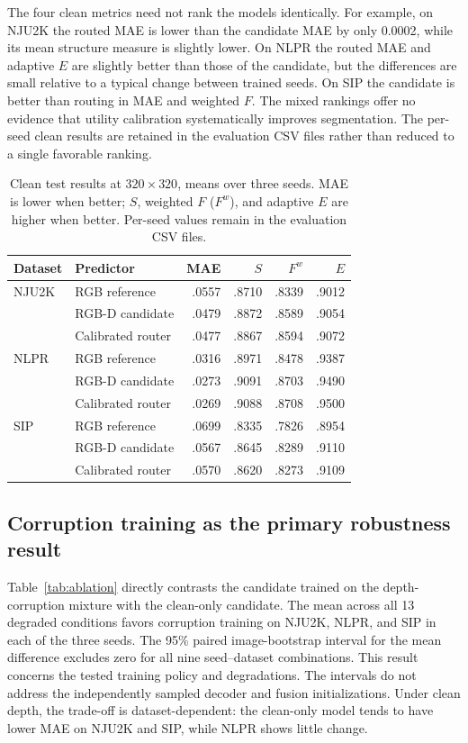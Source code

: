 \documentclass[11pt]{article}
\begin{document}
The four clean metrics need not rank the models identically. For example, on NJU2K the routed MAE is lower than the candidate MAE by only 0.0002, while its mean structure measure is slightly lower. On NLPR the routed MAE and adaptive $E$ are slightly better than those of the candidate, but the differences are small relative to a typical change between trained seeds. On SIP the candidate is better than routing in MAE and weighted $F$. The mixed rankings offer no evidence that utility calibration systematically improves segmentation. The per-seed clean results are retained in the evaluation CSV files rather than reduced to a single favorable ranking.

\begin{table}[t]\centering\small
\caption{Clean test results at $320\times320$, means over three seeds. MAE is lower when better; $S$, weighted $F$ ($F^w$), and adaptive $E$ are higher when better. Per-seed values remain in the evaluation CSV files.}
\label{tab:clean}
\begin{tabular}{llrrrr}\toprule Dataset & Predictor & MAE & $S$ & $F^w$ & $E$\\\midrule
NJU2K & RGB reference & .0557 & .8710 & .8339 & .9012\\
 & RGB-D candidate & .0479 & .8872 & .8589 & .9054\\
 & Calibrated router & .0477 & .8867 & .8594 & .9072\\\midrule
NLPR & RGB reference & .0316 & .8971 & .8478 & .9387\\
 & RGB-D candidate & .0273 & .9091 & .8703 & .9490\\
 & Calibrated router & .0269 & .9088 & .8708 & .9500\\\midrule
SIP & RGB reference & .0699 & .8335 & .7826 & .8954\\
 & RGB-D candidate & .0567 & .8645 & .8289 & .9110\\
 & Calibrated router & .0570 & .8620 & .8273 & .9109\\\bottomrule\end{tabular}
\end{table}

\subsection{Corruption training as the primary robustness result}
Table~\ref{tab:ablation} directly contrasts the candidate trained on the depth-corruption mixture with the clean-only candidate. The mean across all 13 degraded conditions favors corruption training on NJU2K, NLPR, and SIP in each of the three seeds. The 95\% paired image-bootstrap interval for the mean difference excludes zero for all nine seed--dataset combinations. This result concerns the tested training policy and degradations. The intervals do not address the independently sampled decoder and fusion initializations. Under clean depth, the trade-off is dataset-dependent: the clean-only model tends to have lower MAE on NJU2K and SIP, while NLPR shows little change.
\end{document}
